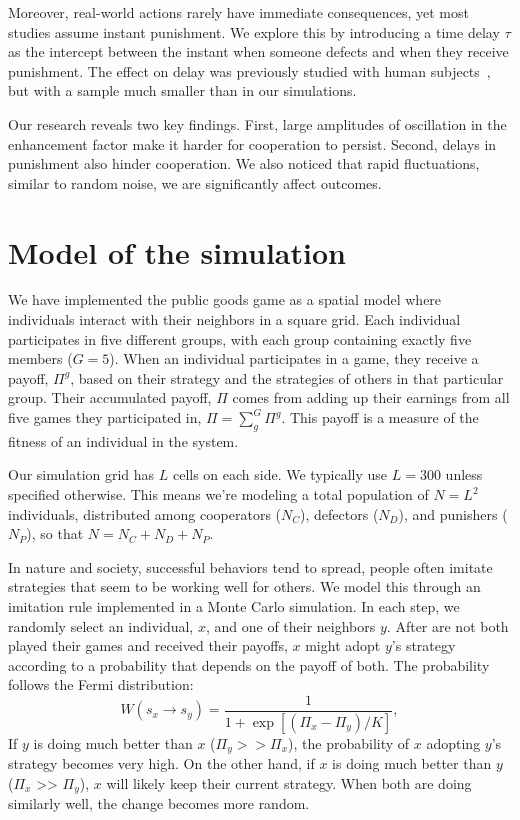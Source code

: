 Moreover, real-world actions rarely have immediate consequences, yet most studies assume instant punishment. We explore this by introducing a time delay $\tau$ as the intercept between the instant when someone defects and when they receive punishment. The effect on delay was previously studied with human subjects~\cite{Late}, but with a sample much smaller than in our simulations.

Our research reveals two key findings. First, large amplitudes of oscillation in the enhancement factor make it harder for cooperation to persist. Second, delays in punishment also hinder cooperation. We also noticed that rapid fluctuations, similar to random noise, we are significantly affect outcomes.



\section{Model of the simulation}
\label{3model}




We have implemented the public goods game as a spatial model where individuals interact with their neighbors in a square grid. Each individual participates in five different groups, with each group containing exactly five members ($G=5$). When an individual participates in a game, they receive a payoff, $\Pi^g$, based on their strategy and the strategies of others in that particular group. Their accumulated payoff, $\Pi$ comes from adding up their earnings from all five games they participated in, $\Pi=\sum_g^G \Pi^g$. This payoff is a measure of the fitness of an individual in the system.

Our simulation grid has $L$ cells on each side. We typically use $L=300$ unless specified otherwise. This means we're modeling a total population of $N=L^2$ individuals, distributed among cooperators ($N_C$), defectors ($N_D$), and punishers ($N_P$), so that $N=N_C+N_D+N_P$.

In nature and society, successful behaviors tend to spread, people often imitate strategies that seem to be working well for others. We model this through an imitation rule implemented in a Monte Carlo simulation. In each step, we randomly select an individual, $x$, and one of their neighbors $y$. After are not both played their games and received their payoffs, $x$ might adopt $y$'s strategy according to a probability that depends on the payoff of both. The probability follows the Fermi distribution:
\begin{equation}
W(s_x \rightarrow s_y)=\frac{1}{1+\exp[(\Pi_{x}-\Pi_{y})/K]},
\end{equation}
If $y$ is doing much better than $x$ ($\Pi_y >> \Pi_x$), the probability of $x$ adopting $y$'s strategy becomes very high. On the other hand, if $x$ is doing much better than $y$ ($\Pi_x$ >> $\Pi_y$), $x$ will likely keep their current strategy. When both are doing similarly well, the change becomes more random.

